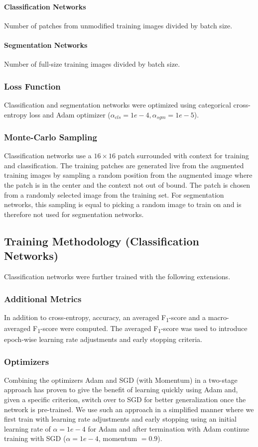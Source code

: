 \documentclass[10pt,conference,compsocconf]{IEEEtran}
\begin{document}
\paragraph{Classification Networks} Number of patches from unmodified training images divided by batch size.
\paragraph{Segmentation Networks} Number of full-size training images divided by batch size.

\subsubsection{Loss Function}
Classification and segmentation networks were optimized using categorical cross-entropy loss and Adam optimizer ($\alpha_{cls} = {1e-4}, \alpha_{sgm} = 1e-5$).

\subsubsection{Monte-Carlo Sampling}
Classification networks use a $16\times 16$ patch surrounded with context for training and classification. The training patches are generated live from the augmented training images by sampling a random position from the augmented image where the patch is in the center and the context not out of bound. The patch is chosen from a randomly selected image from the training set. For segmentation networks, this sampling is equal to picking a random image to train on and is therefore not used for segmentation networks.


\subsection{Training Methodology (Classification Networks)}
\label{subsec:training-methodoloy-cn}
Classification networks were further trained with the following extensions.
\subsubsection{Additional Metrics}
In addition to cross-entropy, accuracy, an averaged F\textsubscript{1}-score and a macro-averaged F\textsubscript{1}-score were computed. The averaged F\textsubscript{1}-score was used to introduce epoch-wise learning rate adjustments and early stopping criteria.

\subsubsection{Optimizers}
Combining the optimizers Adam and SGD (with Momentum) in a two-stage approach\cite{DBLP:journals/corr/abs-1712-07628} has proven to give the benefit of learning quickly using Adam and, given a specific criterion, switch over to SGD for better generalization once the network is pre-trained. We use such an approach in a simplified manner where we first train with learning rate adjustments and early stopping using an initial learning rate of $\alpha = 1e-4$ for Adam and after termination with Adam continue training with SGD ($\alpha=1e-4$, momentum $=0.9$).
\end{document}

